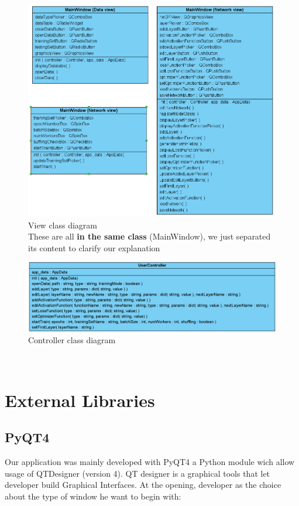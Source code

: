 \begin{figure}[h!]
    \centering 
    \includegraphics[scale=0.5]{figures/ViewDiagram.png}
    \caption{View class diagram \\ These are all \textbf{in the same class} (MainWindow), we just separated its content to clarify our explanation}
  \end{figure}

\begin{figure}[h!]
    \centering 
    \includegraphics[scale=0.4]{figures/ControllerDiagram.png}
    \caption{Controller class diagram}
  \end{figure} 

\vfill

\newpage
~
\newpage
\section{External Libraries}
\subsection{PyQT4}
Our application was mainly developed with PyQT4 a Python module wich allow usage of QTDesigner (version 4). QT designer is a graphical tools that let developer build Graphical Interfaces. At the opening, developer as the choice about the type of window he want to begin with: 

